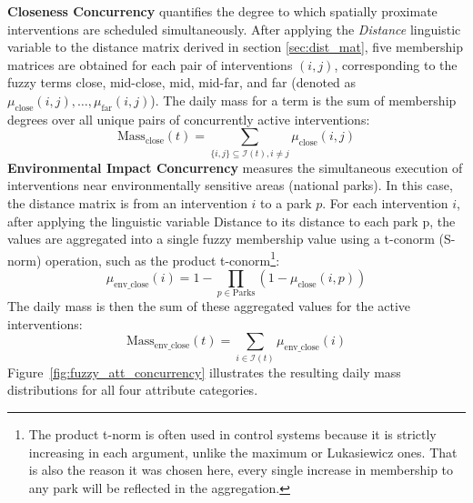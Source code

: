 \textbf{Closeness Concurrency} quantifies the degree to which spatially proximate interventions are scheduled simultaneously. After applying the \textit{Distance} linguistic variable to the distance matrix derived in section \ref{sec:dist_mat}, five membership matrices are obtained for each pair of interventions $(i, j)$, corresponding to the fuzzy terms close, mid-close, mid, mid-far, and far (denoted as $\mu_{\text{close}}(i, j),\dots ,\mu_{\text{far}}(i, j)$). The daily mass for a term is the sum of membership degrees over all unique pairs of concurrently active interventions:
\[
    \text{Mass}_{\text{close}}(t) = \sum_{\{i,j\} \subseteq \mathcal{I}(t), i \neq j} \mu_{\text{close}}(i, j)
\]
\textbf{Environmental Impact Concurrency} measures the simultaneous execution of interventions near environmentally sensitive areas (national parks). In this case, the distance matrix is from an intervention $i$ to a park $p$. 
For each intervention $i$, after applying the linguistic variable Distance to its distance to each park p, the values are aggregated into a single fuzzy membership value using a t-conorm (S-norm) operation, 
such as the product t-conorm\footnote{The product t-norm is often used in control systems because it is strictly increasing in each argument, unlike the maximum or Lukasiewicz ones. That is also the reason it was chosen here, every single increase in membership to any park will be reflected in the aggregation.}:
\[\mu_{\text{env\_close}}(i) =  1 - \prod_{p \in \text{Parks}} (1-\mu_{\text{close}}(i, p))\]
The daily mass is then the sum of these aggregated values for the active interventions: \[\text{Mass}_{\text{env\_close}}(t) = \sum_{i \in \mathcal{I}(t)} \mu_{\text{env\_close}}(i)\] Figure~\ref{fig:fuzzy_att_concurrency} illustrates the resulting daily mass distributions for all four attribute categories.



